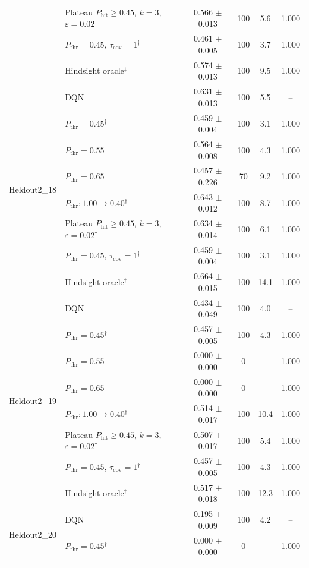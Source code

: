 \begin{table}[htbp]
\begin{tabular}{llcccc}
 & Plateau $P_{\mathrm{hit}}\geq0.45$, $k=3$, $\varepsilon=0.02$$^{\dagger}$ & 0.566 $\pm$ 0.013 & 100 & 5.6 & 1.000 \\
 & $P_{\mathrm{thr}}=0.45$, $\tau_{\mathrm{cov}}=1$$^{\dagger}$ & 0.461 $\pm$ 0.005 & 100 & 3.7 & 1.000 \\
 & Hindsight oracle$^{\ddagger}$ & 0.574 $\pm$ 0.013 & 100 & 9.5 & 1.000 \\
\midrule
\multirow{8}{*}{Heldout2\_18} & DQN & 0.631 $\pm$ 0.013 & 100 & 5.5 & -- \\
 & $P_{\mathrm{thr}}=0.45$$^{\dagger}$ & 0.459 $\pm$ 0.004 & 100 & 3.1 & 1.000 \\
 & $P_{\mathrm{thr}}=0.55$ & 0.564 $\pm$ 0.008 & 100 & 4.3 & 1.000 \\
 & $P_{\mathrm{thr}}=0.65$ & 0.457 $\pm$ 0.226 & 70 & 9.2 & 1.000 \\
 & $P_{\mathrm{thr}}: 1.00 \to 0.40$$^{\dagger}$ & 0.643 $\pm$ 0.012 & 100 & 8.7 & 1.000 \\
 & Plateau $P_{\mathrm{hit}}\geq0.45$, $k=3$, $\varepsilon=0.02$$^{\dagger}$ & 0.634 $\pm$ 0.014 & 100 & 6.1 & 1.000 \\
 & $P_{\mathrm{thr}}=0.45$, $\tau_{\mathrm{cov}}=1$$^{\dagger}$ & 0.459 $\pm$ 0.004 & 100 & 3.1 & 1.000 \\
 & Hindsight oracle$^{\ddagger}$ & 0.664 $\pm$ 0.015 & 100 & 14.1 & 1.000 \\
\midrule
\multirow{8}{*}{Heldout2\_19} & DQN & 0.434 $\pm$ 0.049 & 100 & 4.0 & -- \\
 & $P_{\mathrm{thr}}=0.45$$^{\dagger}$ & 0.457 $\pm$ 0.005 & 100 & 4.3 & 1.000 \\
 & $P_{\mathrm{thr}}=0.55$ & 0.000 $\pm$ 0.000 & 0 & -- & 1.000 \\
 & $P_{\mathrm{thr}}=0.65$ & 0.000 $\pm$ 0.000 & 0 & -- & 1.000 \\
 & $P_{\mathrm{thr}}: 1.00 \to 0.40$$^{\dagger}$ & 0.514 $\pm$ 0.017 & 100 & 10.4 & 1.000 \\
 & Plateau $P_{\mathrm{hit}}\geq0.45$, $k=3$, $\varepsilon=0.02$$^{\dagger}$ & 0.507 $\pm$ 0.017 & 100 & 5.4 & 1.000 \\
 & $P_{\mathrm{thr}}=0.45$, $\tau_{\mathrm{cov}}=1$$^{\dagger}$ & 0.457 $\pm$ 0.005 & 100 & 4.3 & 1.000 \\
 & Hindsight oracle$^{\ddagger}$ & 0.517 $\pm$ 0.018 & 100 & 12.3 & 1.000 \\
\midrule
\multirow{8}{*}{Heldout2\_20} & DQN & 0.195 $\pm$ 0.009 & 100 & 4.2 & -- \\
 & $P_{\mathrm{thr}}=0.45$$^{\dagger}$ & 0.000 $\pm$ 0.000 & 0 & -- & 1.000 \\
$$
\end{tabular}
\end{table}
